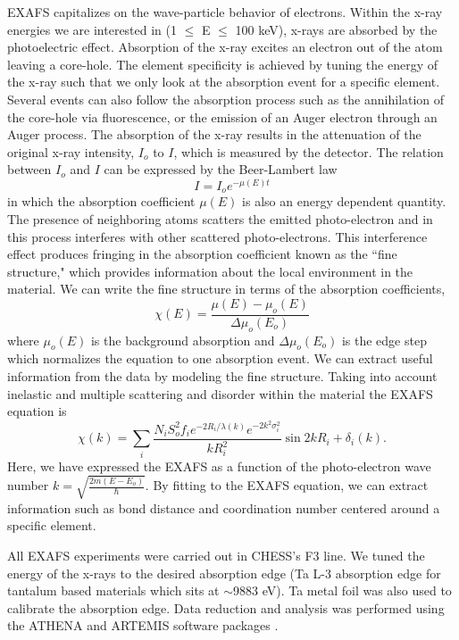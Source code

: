 EXAFS capitalizes on the wave-particle behavior of electrons. Within the x-ray energies we are interested in (1 $\leq$ E $\leq$ 100 keV), x-rays are absorbed by the photoelectric effect. Absorption of the x-ray excites an electron out of the atom leaving a core-hole. The element specificity is achieved by tuning the energy of the x-ray such that we only look at the absorption event for a specific element. Several events can also follow the absorption process such as the annihilation of the core-hole via fluorescence, or the emission of an Auger electron through an Auger process. The absorption of the x-ray results in the attenuation of the original x-ray intensity, $I_{o}$ to $I$, which is measured by the detector. The relation between $I_{o}$ and $I$ can be expressed by the Beer-Lambert law 
\begin{equation}
I = I_{o}e^{-\mu(E) t}
\label{eq:BL}
\end{equation}
in which the absorption coefficient $\mu(E)$ is also an energy dependent quantity. The presence of neighboring atoms scatters the emitted photo-electron and in this process interferes with other scattered photo-electrons. This interference effect produces fringing in the absorption coefficient known as the ``fine structure," which provides information about the local environment in the material. We can write the fine structure in terms of the absorption coefficients,
\begin{equation} 
\chi(E) = \frac{\mu(E) - \mu_{o}(E)}{\Delta\mu_{o}(E_{o})}
\label{eq:EXAFS_chi}
\end{equation}
where $\mu_{o}(E)$ is the background absorption and $\Delta\mu_{o}(E_{o})$ is the edge step which normalizes the equation to one absorption event. We can extract useful information from the data by modeling the fine structure. Taking into account inelastic and multiple scattering and disorder within the material the EXAFS equation is
\begin{equation} 
\chi(k) = \sum_{i}\frac{N_{i}S_{o}^{2}f_{i}e^{-2R_{i}/\lambda(k)}e^{-2k^{2}\sigma_{i}^{2}}}{kR^{2}_{i}} \sin{2kR_{i} + \delta_{i}(k)}.
\label{eq:exafs2}
\end{equation}
Here, we have expressed the EXAFS as a function of the photo-electron wave number $k = \sqrt{\frac{2m(E-E_{o})}{\hbar}}$. By fitting to the EXAFS equation, we can extract information such as bond distance and coordination number centered around a specific element. 

All EXAFS experiments were carried out in CHESS's F3 line. We tuned the energy of the x-rays to the desired absorption edge (Ta L-3 absorption edge for tantalum based materials which sits at $\sim$9883 eV). Ta metal foil was also used to calibrate the absorption edge. Data reduction and analysis was performed using the ATHENA and ARTEMIS software packages \cite{Ravel2005}.
